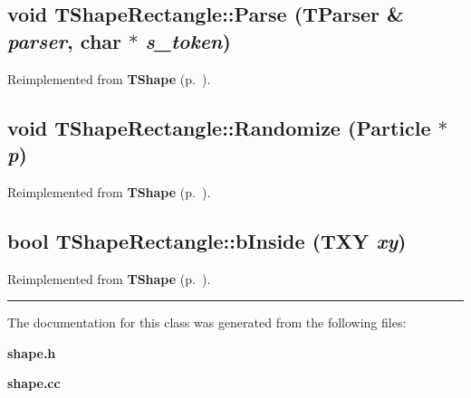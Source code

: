 \label{TShapeRectangle_a1}
\subsection{\setlength{\rightskip}{0pt plus 5cm}void TShape\-Rectangle::Parse ({\bf TParser} \& {\em parser}, char $\ast$ {\em s\_\-token})\hspace{0.3cm}{\tt  [virtual]}}



Reimplemented from {\bf TShape} {\rm (p.~\pageref{TShape_a0})}.\label{TShapeRectangle_a2}
\subsection{\setlength{\rightskip}{0pt plus 5cm}void TShape\-Rectangle::Randomize ({\bf Particle} $\ast$ {\em p})\hspace{0.3cm}{\tt  [virtual]}}



Reimplemented from {\bf TShape} {\rm (p.~\pageref{TShape_a1})}.\label{TShapeRectangle_a3}
\subsection{\setlength{\rightskip}{0pt plus 5cm}bool TShape\-Rectangle::b\-Inside ({\bf TXY} {\em xy})\hspace{0.3cm}{\tt  [virtual]}}



Reimplemented from {\bf TShape} {\rm (p.~\pageref{TShape_a2})}.\vspace{0.4cm}\hrule\vspace{0.2cm}
The documentation for this class was generated from the following files:\begin{CompactItemize}
\item 
{\bf shape.h}\item 
{\bf shape.cc}\end{CompactItemize}
